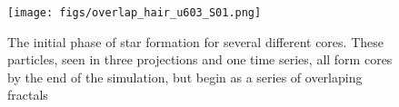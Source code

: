 
\begin{figure} \begin{center}
\texttt{[image: figs/overlap\_hair\_u603\_S01.png]}
\caption[ ]{The initial phase of star formation for several different cores.  These particles, seen in three
projections and one time series, all form cores by the end of the simulation,
but begin as a series of overlaping fractals}
\label{fig.cores} \end{center} \end{figure}
